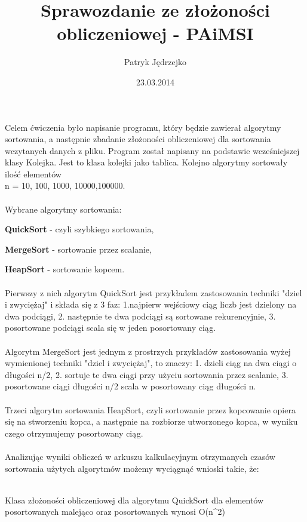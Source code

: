 \documentclass{article}
\begin{document}
\title{Sprawozdanie ze złożoności obliczeniowej - PAiMSI}
\author{Patryk Jędrzejko}
\date{23.03.2014}
\maketitle
\begin{flushleft}
\indent
Celem ćwiczenia było napisanie programu, który będzie zawierał algorytmy sortowania, a następnie zbadanie złożoności obliczeniowej dla sortowania wczytanych danych z pliku. Program został napisany na podstawie wcześniejszej klasy Kolejka. Jest to klasa kolejki jako tablica.
Kolejno algorytmy sortowały ilość elementów
\\n = 10, 100, 1000, 10000,100000.\\
\indent
\\Wybrane algorytmy sortowania:
\item \textbf{QuickSort} - czyli szybkiego sortowania,
\item \textbf{MergeSort} - sortowanie przez scalanie,
\item \textbf{HeapSort} - sortowanie kopcem.
\\
\indent
\\Pierwszy z nich algorytm QuickSort jest przykładem zastosowania techniki "dziel i zwyciężaj" i składa się z 3 faz: 1.najpierw wejściowy ciąg liczb jest dzielony na dwa podciągi, 2. następnie te dwa podciągi są sortowane rekurencyjnie, 3. posortowane podciągi scala się w jeden posortowany ciąg.\\
\indent
\\Algorytm MergeSort jest jednym z prostrzych przykładów zastosowania wyżej wymienionej techniki "dziel i zwyciężaj", to znaczy: 1. dzieli ciąg na dwa ciągi o długości n/2, 2. sortuje te dwa ciągi przy użyciu sortowania przez scalanie, 3. posortowane ciągi długości n/2 scala w posortowany ciąg długości n.\\
\indent
\\Trzeci algorytm sortowania HeapSort, czyli sortowanie przez kopcowanie opiera się na stworzeniu kopca, a następnie na rozbiorze utworzonego kopca, w wyniku czego otrzymujemy posortowany ciąg.\\
\indent
\\Analizując wyniki obliczeń w arkuszu kalkulacyjnym otrzymanych czasów sortowania użytych algorytmów możemy wyciągnąć wnioski takie, że:\\
\\
\item Klasa złożoności obliczeniowej dla algorytmu QuickSort dla elementów posortowanych malejąco oraz posortowanych wynosi O(n^2)

\end{flushleft}
\end{document}

